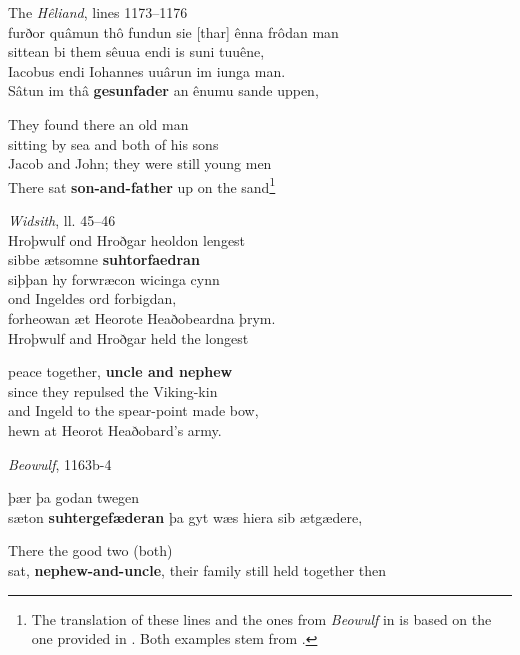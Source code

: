 \ea%
    \label{ex:6:20}
\ea The \textit{Hêliand}, lines 1173--1176\\
furðor quâmun \qquad thô fundun sie [thar] ênna frôdan man\\
sittean bi them sêuua \qquad endi is suni tuuêne,\\
Iacobus endi Iohannes \qquad uuârun im iunga man.\\
Sâtun im thâ \textbf{gesunfader} \qquad an ênumu sande uppen,\\\medskip

They found there an old man\\
sitting by sea and both of his sons\\
Jacob and John; they were still young men\\

There sat \textbf{son-and-father} up on the sand\footnote{{The translation of these lines and the ones from} {\textit{Beowulf}} {in  is based on the one provided in \citet[67]{Schürr2013}. Both examples stem from \citet[145--146]{Haubrichs1988}.} }

\ex \textit{Widsith}, ll. 45--46\\
Hroþwulf ond Hroðgar \qquad heoldon lengest\\
sibbe ætsomne \qquad \textbf{suhtorfaedran}\\
siþþan hy forwræcon wicinga cynn\\
ond Ingeldes ord forbigdan,\\
forheowan æt Heorote Heaðobeardna þrym.\\
Hroþwulf and Hroðgar held the longest\\\medskip

peace together, \textbf{uncle and nephew}\\
since they repulsed the Viking-kin\\
and Ingeld to the spear-point made bow,\\
hewn at Heorot Heaðobard's army.

\ex \textit{Beowulf}, 1163b-4

þær þa godan twegen \\
sæton \textbf{suhtergefæderan} \qquad þa gyt wæs hiera sib ætgædere,\\\medskip

There the good two (both)\\
sat, \textbf{nephew-and-uncle}, their family still held together then
    \z
    \z


